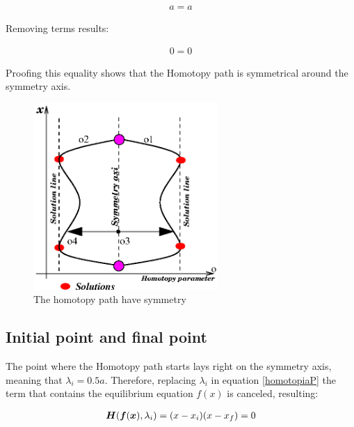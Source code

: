 \documentclass[journal,twocolumn]{IEEEtran}
\newcommand{\pig}[1]{\mbox{\boldmath ${#1}$}	}
\begin{document}
\begin{displaymath}
\begin{array}{l}
a=a
\end{array}
\end{displaymath}

Removing terms results:

\begin{displaymath}
\begin{array}{c}
0=0
\end{array}
\end{displaymath}

Proofing this equality shows that the Homotopy path is symmetrical around the symmetry axis.

{
\tiny
\begin{figure}[hbtp]
\centering
\includegraphics[width=7cm]{nh3figs/simetria.eps}
\caption{The homotopy path have symmetry}
\label{simetria}
\end{figure}
}

\subsection{Initial point and final point}

The point where the Homotopy path starts lays right on the symmetry axis, meaning that $\lambda_i=0.5a$. Therefore, replacing $\lambda_i$ in equation \ref{homotopiaP} the term that contains the equilibrium equation $f(x)$ is canceled, resulting:

\begin{displaymath}
\begin{array}{r}
\pig{H}(\pig{f}(\pig{x}),\lambda_i )=(x-x_i)(x-x_f)=0  \\
\end{array}
\end{displaymath}
\end{document}
